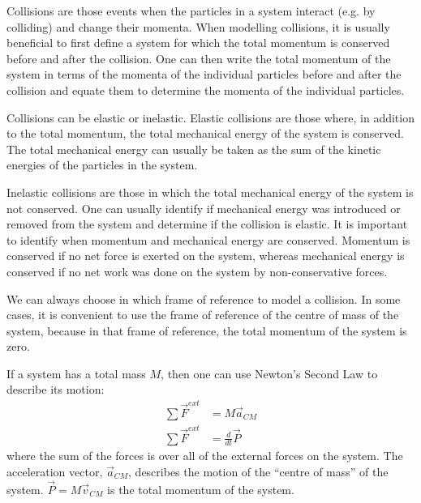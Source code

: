 \begin{chapterSummary}
{Collisions are those events when the particles in a system interact (e.g. by colliding) and change their momenta. When modelling collisions, it is usually beneficial to first define a system for which the total momentum is conserved before and after the collision. One can then write the total momentum of the system in terms of the momenta of the individual particles before and after the collision and equate them to determine the momenta of the individual particles.

Collisions can be elastic or inelastic. Elastic collisions are those where, in addition to the total momentum, the total mechanical energy of the system is conserved. The total mechanical energy can usually be taken as the sum of the kinetic energies of the particles in the system.

Inelastic collisions are those in which the total mechanical energy of the system is not conserved. One can usually identify if mechanical energy was introduced or removed from the system and determine if the collision is elastic. It is important to identify when momentum and mechanical energy are conserved. Momentum is conserved if no net force is exerted on the system, whereas mechanical energy is conserved if no net work was done on the system by non-conservative forces.

We can always choose in which frame of reference to model a collision. In some cases, it is convenient to use the frame of reference of the centre of mass of the system, because in that frame of reference, the total momentum of the system is zero.

If a system has a total mass $M$, then one can use Newton's Second Law to describe its motion:
\begin{align*}
\sum \vec F^{ext} &= M \vec a_{CM}\\
\sum \vec F^{ext} &=\frac{d}{dt} \vec P
\end{align*}
where the sum of the forces is over all of the external forces on the system. The acceleration vector, $\vec a_{CM}$, describes the motion of the ``centre of mass'' of the system. $\vec P=M\vec v_{CM}$ is the total momentum of the system.

}
\end{chapterSummary}
